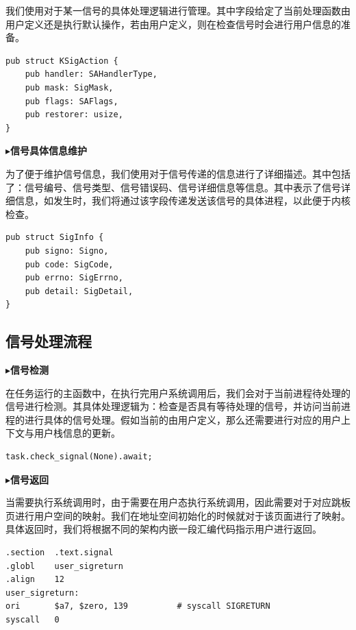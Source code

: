 \documentclass{article}
\begin{document}
我们使用对于某一信号的具体处理逻辑进行管理。其中字段给定了当前处理函数由用户定义还是执行默认操作，若由用户定义，则在检查信号时会进行用户信息的准备。

\begin{lstlisting}
pub struct KSigAction {
    pub handler: SAHandlerType,
    pub mask: SigMask,
    pub flags: SAFlags,
    pub restorer: usize,
}
\end{lstlisting}

$\blacktriangleright$\textbf{信号具体信息维护}

为了便于维护信号信息，我们使用对于信号传递的信息进行了详细描述。其中包括了：信号编号、信号类型、信号错误码、信号详细信息等信息。其中表示了信号详细信息，如发生时，我们将通过该字段传递发送该信号的具体进程，以此便于内核检查。

\begin{lstlisting}
pub struct SigInfo {
    pub signo: Signo,
    pub code: SigCode,
    pub errno: SigErrno,
    pub detail: SigDetail,
}
\end{lstlisting}

\subsection{信号处理流程}

$\blacktriangleright$\textbf{信号检测}

在任务运行的主函数中，在执行完用户系统调用后，我们会对于当前进程待处理的信号进行检测。其具体处理逻辑为：检查是否具有等待处理的信号，并访问当前进程的进行具体的信号处理。假如当前的由用户定义，那么还需要进行对应的用户上下文与用户栈信息的更新。

\begin{lstlisting}
task.check_signal(None).await;
\end{lstlisting}

$\blacktriangleright$\textbf{信号返回}

当需要执行系统调用时，由于需要在用户态执行系统调用，因此需要对于对应跳板页进行用户空间的映射。我们在地址空间初始化的时候就对于该页面进行了映射。具体返回时，我们将根据不同的架构内嵌一段汇编代码指示用户进行返回。

\begin{lstlisting}
.section  .text.signal
.globl    user_sigreturn
.align    12
user_sigreturn:
ori       $a7, $zero, 139          # syscall SIGRETURN
syscall   0
\end{lstlisting}
\end{document}
